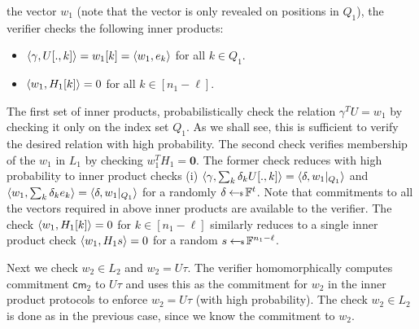 the vector $w_1$ (note that the vector is only revealed on positions in $Q_1$), the verifier checks the following inner products:
\begin{itemize}
\item $\langle \gamma,U[.,k]\rangle=w_1[k]=\langle w_1,e_k\rangle$ for all $k\in Q_1$.
\item $\langle w_1,H_1[k]\rangle=0$ for all $k\in [n_1-\ell]$.
\end{itemize}
The first set of inner products, probabilistically check the relation
$\gamma^TU=w_1$ by checking it only on the index set $Q_1$. As we shall see,
this is sufficient to verify the desired relation with high probability. The
second check verifies membership of the $w_1$ in $L_1$ by checking
$w_1^TH_1=\bm{0}$. The former check reduces with high probability to inner
product checks (i) $\langle \gamma,\sum_k
\delta_kU[.,k]\rangle=\langle \delta,w_1|_{Q_1}\rangle$ and
$\langle w_1,\sum_k\delta_ke_k\rangle=\langle \delta,w_1|_{Q_1}\rangle$ for a randomly
$\delta\hskip2.3pt{\gets\!\!\mbox{\tiny${\$}$\normalsize}}\, \mathbb{F}^t$. Note that
commitments to all the vectors required in above inner products are available
to the verifier. The check $\langle w_1,H_1[k]\rangle=0$ for $k\in [n_1-\ell]$
similarly reduces to a single inner product check $\langle w_1,H_1s\rangle=0$ for a
random $s\hskip2.3pt{\gets\!\!\mbox{\tiny${\$}$\normalsize}}\, \mathbb{F}^{n_1-\ell}$. 

Next we check $w_2\in L_2$ and $w_2=U\tau$. The verifier homomorphically
computes commitment $\mathsf{cm}_2$ to $U\tau$ and uses this as the commitment
for $w_2$ in the inner product protocols to enforce $w_2=U\tau$ (with high
probability). The check $w_2\in L_2$ is done as in the previous case, since we
know the commitment to $w_2$.

